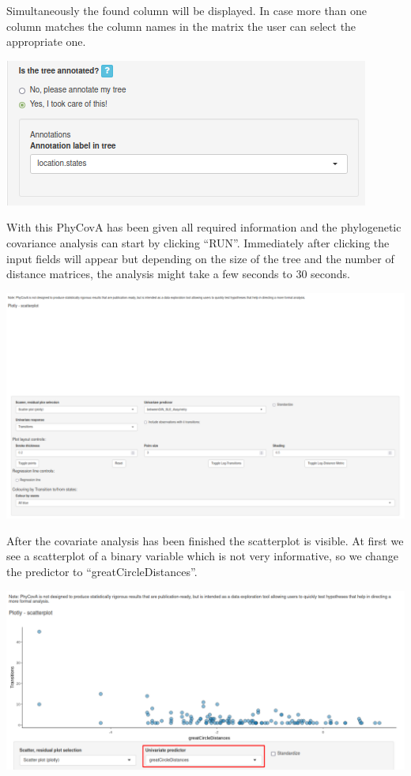 \documentclass[
]{article}
\begin{document}
Simultaneously the found column will be displayed. In case more than one
column matches the column names in the matrix the user can select the
appropriate one.

\includegraphics{tutorial_img/SelectedColumn_Found.png}

With this PhyCovA has been given all required information and the
phylogenetic covariance analysis can start by clicking ``RUN''.
Immediately after clicking the input fields will appear but depending on
the size of the tree and the number of distance matrices, the analysis
might take a few seconds to 30 seconds.

\includegraphics{tutorial_img/Loading_Run.png}

After the covariate analysis has been finished the scatterplot is
visible. At first we see a scatterplot of a binary variable which is not
very informative, so we change the predictor to
``greatCircleDistances''.

\includegraphics{tutorial_img/changePredictor.png}
\end{document}
